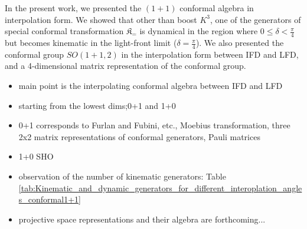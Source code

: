 \documentclass[%
 reprint,
superscriptaddress,
 amsmath,amssymb,
 aps,
]{revtex4-2}
\begin{document}
{\color{blue} In the present work, we presented the $(1+1)$ conformal algebra in interpolation form. We showed that other than boost $K^{3}$, one of the generators of special conformal transformation $\mathfrak{K}_{\hat{-}}$ is dynamical in the region where $0\leq\delta<\frac{\pi}{4}$ but becomes kinematic in the light-front limit ($\delta=\frac{\pi}{4}$). We also presented the conformal group $SO(1+1,2)$ in the interpolation form between IFD and LFD, and a 4-dimensional matrix representation of the conformal group.}
{\color{red}
\begin{itemize}
\item main point is the interpolating conformal algebra between IFD and LFD
    \item starting from the lowest dims;0+1 and 1+0
    \item 0+1 corresponds to Furlan and Fubini, etc., Moebius transformation, three 2x2 matrix representations of conformal generators, Pauli matrices
    \item 1+0
    SHO
    \item observation of the number of kinematic generators: Table \ref{tab:Kinematic_and_dynamic_generators_for_different_interoplation_angles_conformal1+1}
    \item projective space representations and their algebra are forthcoming... 
\end{itemize}

}

\acknowledgments

\appendix
\end{document}
